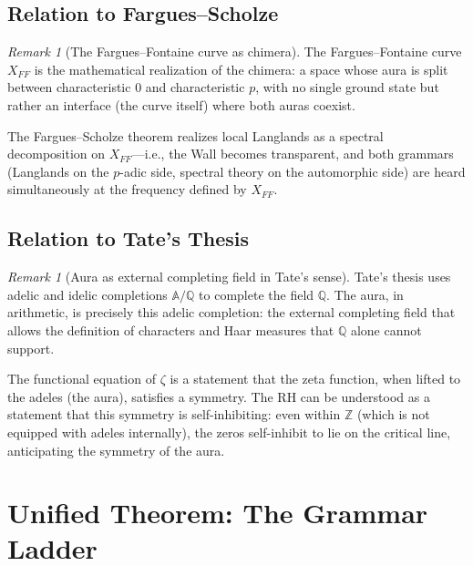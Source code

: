 \documentclass[12pt]{article}
\theoremstyle{definition}
\theoremstyle{remark}
\newtheorem{remark}[theorem]{Remark}
\begin{document}
\subsection{Relation to Fargues--Scholze}

\begin{remark}[The Fargues--Fontaine curve as chimera]
The Fargues--Fontaine curve $X_{FF}$ is the mathematical realization of the chimera: a space whose aura is split between characteristic $0$ and characteristic $p$, with no single ground state but rather an interface (the curve itself) where both auras coexist.

The Fargues--Scholze theorem realizes local Langlands as a spectral decomposition on $X_{FF}$---i.e., the Wall becomes transparent, and both grammars (Langlands on the $p$-adic side, spectral theory on the automorphic side) are heard simultaneously at the frequency defined by $X_{FF}$.
\end{remark}

\subsection{Relation to Tate's Thesis}

\begin{remark}[Aura as external completing field in Tate's sense]
Tate's thesis uses adelic and idelic completions $\mathbb{A} / \mathbb{Q}$ to complete the field $\mathbb{Q}$. The aura, in arithmetic, is precisely this adelic completion: the external completing field that allows the definition of characters and Haar measures that $\mathbb{Q}$ alone cannot support.

The functional equation of $\zeta$ is a statement that the zeta function, when lifted to the adeles (the aura), satisfies a symmetry. The RH can be understood as a statement that this symmetry is self-inhibiting: even within $\mathbb{Z}$ (which is not equipped with adeles internally), the zeros self-inhibit to lie on the critical line, anticipating the symmetry of the aura.
\end{remark}

\section{Unified Theorem: The Grammar Ladder}
\end{document}
